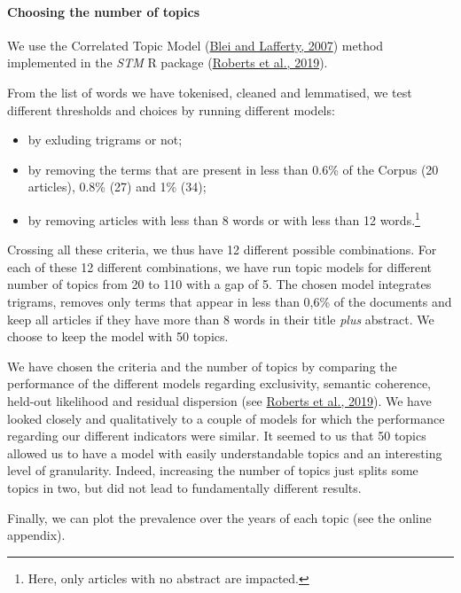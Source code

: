 \documentclass[
  12pt,
  onecolumn]{article}
\providecommand{\tightlist}{%
  \setlength{\itemsep}{0pt}\setlength{\parskip}{0pt}}
\begin{document}
\hypertarget{choosing-the-number-of-topics}{%
\paragraph*{Choosing the number of topics}\label{choosing-the-number-of-topics}}

We use the Correlated Topic Model (\protect\hyperlink{ref-blei2007}{Blei and Lafferty, 2007}) method implemented in the \emph{STM} R package (\protect\hyperlink{ref-roberts2019}{Roberts et al., 2019}).

From the list of words we have tokenised, cleaned and lemmatised, we test different thresholds and choices by running different models:

\begin{itemize}
\tightlist
\item
  by exluding trigrams or not;
\item
  by removing the terms that are present in less than 0.6\% of the Corpus (20 articles), 0.8\% (27) and 1\% (34);
\item
  by removing articles with less than 8 words or with less than 12 words.\footnote{Here, only articles with no abstract are impacted.}
\end{itemize}

Crossing all these criteria, we thus have 12 different possible combinations. For each of these 12 different combinations, we have run topic models for different number of topics from 20 to 110 with a gap of 5. The chosen model integrates trigrams, removes only terms that appear in less than 0,6\% of the documents and keep all articles if they have more than 8 words in their title \emph{plus} abstract. We choose to keep the model with 50 topics.

We have chosen the criteria and the number of topics by comparing the performance of the different models regarding exclusivity, semantic coherence, held-out likelihood and residual dispersion (see \protect\hyperlink{ref-roberts2019}{Roberts et al., 2019}). We have looked closely and qualitatively to a couple of models for which the performance regarding our different indicators were similar. It seemed to us that 50 topics allowed us to have a model with easily understandable topics and an interesting level of granularity. Indeed, increasing the number of topics just splits some topics in two, but did not lead to fundamentally different results.

Finally, we can plot the prevalence over the years of each topic (see the online appendix).
\end{document}
